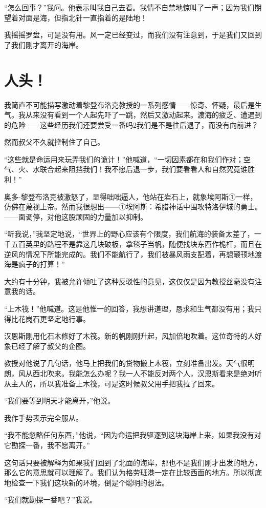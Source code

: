 \documentclass[10pt]{book}
\begin{document}
“怎么回事？”我问。他表示叫我自己去看。我情不自禁地惊叫了一声；因为我们期望着对面是海，但指北针一直指着的是陆地！

我摇摇罗盘，可是没有用。风一定已经变过，而我们没有注意到，于是我们又回到了我们刚才离开的海岸。
\chapter{人头！}
我简直不可能描写激动着黎登布洛克教授的一系列感情——惊奇、怀疑，最后是生气。我从来没有看到一个人起先吓了一跳，然后又激动起来。渡海的疲乏、遭遇到的危险——这些经历我们还要尝受一番吗2我们是不是往后退了，而没有向前进？

然而叔父不久就控制住了自己。

“这些就是命运用来玩弄我们的诡计！”他喊道，“一切因素都在和我们作对；空气、火、水联合起来阻挡我们！我不愿后退一步，我们要看看人和自然究竟谁胜利！”

奥多-黎登布洛克被激怒了，显得咄咄逼人，他站在岩石上，就象埃阿斯①一样，仿佛在蔑视上帝。然而我很想出——①埃阿斯：希腊神话中围攻特洛伊城的勇士。——面调停，对他这股顽固的力量加以抑制。

“听我说，”我坚定地说，“世界上的野心应该有个限度，我们航海的装备太差了，一千五百英里的路程不是靠这几块破板，拿毯子当帆，随便找块东西作桅杆，而且在逆风的情况下所能完成的。我们不能航行了，我们被暴风雨支配着，再想颟顸地渡海是疯子的打算！”

大约有十分钟，我被允许倾吐了这种反驳性的意见，这仅仅是因为教授丝毫没有注意我的话。

“上木筏！”他喊道。这是他惟一的回答，我想讲道理，恳求和生气都没有用；我只得比花岗石更坚定地行事。

汉恩斯刚用化石木修好了木筏。新的帆刚刚升起，风加倍地吹着。这位奇特的人好象已经了解了叔父的企图。

教授对他说了几句话，他马上把我们的贷物搬上木筏，立刻准备出发。天气很明朗，风从西北吹来。我能怎么办呢？我一人不能反对两个人，汉恩斯看来是绝对听从主人的，所以我准备上木筏，可是这时候叔父用手把我拉了回来。

“我们要等到明天才能离开，”他说。

我作手势表示完全服从。

“我不能忽略任何东西，”他说，“因为命运把我驱逐到这块海岸上来，如果我没有对它勘探一番，我不愿离开。”

这句话只要被解释为如果我们回到了北面的海岸，那也不是我们刚才出发的地方，那么它的意思就可以理解了。我们认为格劳班港一定在比较西面的地方。所以彻底地检查一下我们这块新的环境，倒是个聪明的想法。

“我们就勘探一番吧？”我说。
\end{document}

